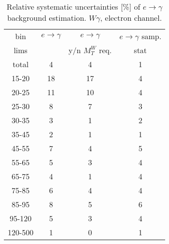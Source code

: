 \begin{table}[h]
  \scriptsize
  \begin{center}
  \caption{Relative systematic uncertainties [\%] of $e\rightarrow\gamma$ background estimation. $W\gamma$, electron channel.}
  \begin{tabular}{|c|c|c|c|}
    bin  & $e\rightarrow\gamma$ & $e\rightarrow\gamma$  & $e\rightarrow\gamma$ samp.\\
    lims  &  & y/n $M_T^W$ req. & stat\\ \hline
    total  & 4 & 4 & 1 \\ \hline
    15-20 & 18 & 17 & 4 \\ \hline
    20-25 & 11 & 10 & 4 \\ \hline
    25-30 & 8 & 7 & 3 \\ \hline
    30-35 & 3 & 1 & 2 \\ \hline
    35-45 & 2 & 1 & 1 \\ \hline
    45-55 & 7 & 4 & 5 \\ \hline
    55-65 & 5 & 3 & 4 \\ \hline
    65-75 & 4 & 1 & 4 \\ \hline
    75-85 & 6 & 4 & 4 \\ \hline
    85-95 & 8 & 5 & 6 \\ \hline
    95-120 & 5 & 3 & 4 \\ \hline
    120-500 & 1 & 0 & 1 \\ \hline
  \end{tabular}
  \label{tab:systInPercentEtogamma_ELECTRON_WGamma}
  \end{center}
\end{table}
